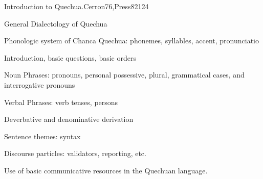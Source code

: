 \begin{syllabus}
\begin{competences}
    \item {}
    \item {}
    \item {}
    \item {}
\end{competences}

\begin{unit}{Introduction to Quechua.}{}{Cerron76,Press82}{12}{4}
   \begin{topics}
      \item General Dialectology of Quechua
      \item Phonologic system of Chanca Quechua: phonemes, syllables, accent, pronunciatio
      \item Introduction, basic questions, basic orders
      \item Noun Phrases: pronouns, personal possessive, plural, grammatical cases, and interrogative pronouns
      \item Verbal Phrases: verb tenses, persons
      \item Deverbative and denominative derivation
      \item Sentence themes: syntax
      \item Discourse particles: validators, reporting, etc.
   \end{topics}

   \begin{learningoutcomes}
      \item Use of basic communicative resources in the Quechuan language.
   \end{learningoutcomes}
\end{unit}

\begin{coursebibliography}
\end{coursebibliography}

\end{syllabus}
